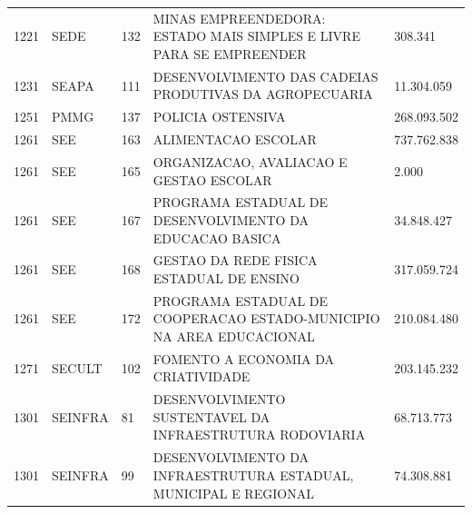 \documentclass{article}
\begin{document}
\begin{longtable}[c]{m{1cm}|m{1.5cm}|m{1cm}m{10cm}|m{2cm}}
\multicolumn{1}{C{1cm}|}{1221} & \multicolumn{1}{L{1.5cm}|}{SEDE} & \multicolumn{1}{C{1cm}|}{132} & \multicolumn{1}{L{10cm}|}{MINAS EMPREENDEDORA: ESTADO MAIS SIMPLES E LIVRE PARA SE EMPREENDER} & \multicolumn{1}{R{2cm}}{308.341} \\
\multicolumn{1}{C{1cm}|}{1231} & \multicolumn{1}{L{1.5cm}|}{SEAPA} & \multicolumn{1}{C{1cm}|}{111} & \multicolumn{1}{L{10cm}|}{DESENVOLVIMENTO DAS CADEIAS PRODUTIVAS DA AGROPECUARIA} & \multicolumn{1}{R{2cm}}{11.304.059} \\
\multicolumn{1}{C{1cm}|}{1251} & \multicolumn{1}{L{1.5cm}|}{PMMG} & \multicolumn{1}{C{1cm}|}{137} & \multicolumn{1}{L{10cm}|}{POLICIA OSTENSIVA} & \multicolumn{1}{R{2cm}}{268.093.502} \\
\multicolumn{1}{C{1cm}|}{1261} & \multicolumn{1}{L{1.5cm}|}{SEE} & \multicolumn{1}{C{1cm}|}{163} & \multicolumn{1}{L{10cm}|}{ALIMENTACAO ESCOLAR} & \multicolumn{1}{R{2cm}}{737.762.838} \\
\multicolumn{1}{C{1cm}|}{1261} & \multicolumn{1}{L{1.5cm}|}{SEE} & \multicolumn{1}{C{1cm}|}{165} & \multicolumn{1}{L{10cm}|}{ORGANIZACAO, AVALIACAO E GESTAO ESCOLAR} & \multicolumn{1}{R{2cm}}{2.000} \\
\multicolumn{1}{C{1cm}|}{1261} & \multicolumn{1}{L{1.5cm}|}{SEE} & \multicolumn{1}{C{1cm}|}{167} & \multicolumn{1}{L{10cm}|}{PROGRAMA ESTADUAL DE DESENVOLVIMENTO DA EDUCACAO BASICA} & \multicolumn{1}{R{2cm}}{34.848.427} \\
\multicolumn{1}{C{1cm}|}{1261} & \multicolumn{1}{L{1.5cm}|}{SEE} & \multicolumn{1}{C{1cm}|}{168} & \multicolumn{1}{L{10cm}|}{GESTAO DA REDE FISICA ESTADUAL DE ENSINO} & \multicolumn{1}{R{2cm}}{317.059.724} \\
\multicolumn{1}{C{1cm}|}{1261} & \multicolumn{1}{L{1.5cm}|}{SEE} & \multicolumn{1}{C{1cm}|}{172} & \multicolumn{1}{L{10cm}|}{PROGRAMA ESTADUAL DE COOPERACAO ESTADO-MUNICIPIO NA AREA EDUCACIONAL} & \multicolumn{1}{R{2cm}}{210.084.480} \\
\multicolumn{1}{C{1cm}|}{1271} & \multicolumn{1}{L{1.5cm}|}{SECULT} & \multicolumn{1}{C{1cm}|}{102} & \multicolumn{1}{L{10cm}|}{FOMENTO A ECONOMIA DA CRIATIVIDADE} & \multicolumn{1}{R{2cm}}{203.145.232} \\
\multicolumn{1}{C{1cm}|}{1301} & \multicolumn{1}{L{1.5cm}|}{SEINFRA} & \multicolumn{1}{C{1cm}|}{81} & \multicolumn{1}{L{10cm}|}{DESENVOLVIMENTO SUSTENTAVEL DA INFRAESTRUTURA RODOVIARIA} & \multicolumn{1}{R{2cm}}{68.713.773} \\
\multicolumn{1}{C{1cm}|}{1301} & \multicolumn{1}{L{1.5cm}|}{SEINFRA} & \multicolumn{1}{C{1cm}|}{99} & \multicolumn{1}{L{10cm}|}{DESENVOLVIMENTO DA INFRAESTRUTURA ESTADUAL, MUNICIPAL E REGIONAL} & \multicolumn{1}{R{2cm}}{74.308.881} \\

\end{longtable}
\end{document}
